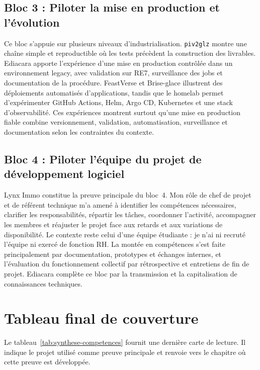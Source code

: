 \subsection*{Bloc 3 : Piloter la mise en production et l'évolution}

Ce bloc s'appuie sur plusieurs niveaux d'industrialisation. \texttt{piv2glz} montre une chaîne simple et reproductible où les tests précèdent la construction des livrables. Ediacara apporte l'expérience d'une mise en production contrôlée dans un environnement legacy, avec validation sur RE7, surveillance des jobs et documentation de la procédure. FeastVerse et Brise-glace illustrent des déploiements automatisés d'applications, tandis que le homelab permet d'expérimenter GitHub Actions, Helm, Argo CD, Kubernetes et une stack d'observabilité. Ces expériences montrent surtout qu'une mise en production fiable combine versionnement, validation, automatisation, surveillance et documentation selon les contraintes du contexte.

\subsection*{Bloc 4 : Piloter l'équipe du projet de développement logiciel}

Lynx Immo constitue la preuve principale du bloc~4. Mon rôle de chef de projet et de référent technique m'a amené à identifier les compétences nécessaires, clarifier les responsabilités, répartir les tâches, coordonner l'activité, accompagner les membres et réajuster le projet face aux retards et aux variations de disponibilité. Le contexte reste celui d'une équipe étudiante : je n'ai ni recruté l'équipe ni exercé de fonction RH. La montée en compétences s'est faite principalement par documentation, prototypes et échanges internes, et l'évaluation du fonctionnement collectif par rétrospective et entretiens de fin de projet. Ediacara complète ce bloc par la transmission et la capitalisation de connaissances techniques.

\section{Tableau final de couverture}

Le tableau~\ref{tab:synthese-competences} fournit une dernière carte de lecture. Il indique le projet utilisé comme preuve principale et renvoie vers le chapitre où cette preuve est développée.

